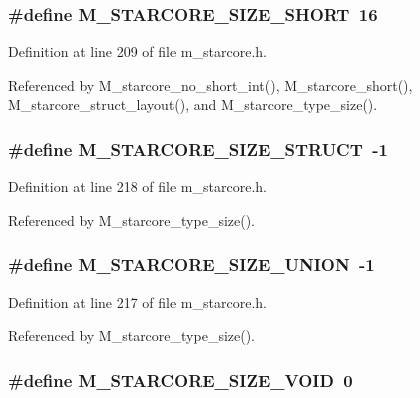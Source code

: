 \subsubsection{\setlength{\rightskip}{0pt plus 5cm}\#define M\_\-STARCORE\_\-SIZE\_\-SHORT~16}\label{m__starcore_8h_25f53aab6d1612ad8fffc411fe5570ed}




Definition at line 209 of file m\_\-starcore.h.

Referenced by M\_\-starcore\_\-no\_\-short\_\-int(), M\_\-starcore\_\-short(), M\_\-starcore\_\-struct\_\-layout(), and M\_\-starcore\_\-type\_\-size().
\subsubsection{\setlength{\rightskip}{0pt plus 5cm}\#define M\_\-STARCORE\_\-SIZE\_\-STRUCT~-1}\label{m__starcore_8h_48676e488cc577454d2aaac4f11f7ef4}




Definition at line 218 of file m\_\-starcore.h.

Referenced by M\_\-starcore\_\-type\_\-size().
\subsubsection{\setlength{\rightskip}{0pt plus 5cm}\#define M\_\-STARCORE\_\-SIZE\_\-UNION~-1}\label{m__starcore_8h_b155b80205b1dc66adb99180a5c11e5c}




Definition at line 217 of file m\_\-starcore.h.

Referenced by M\_\-starcore\_\-type\_\-size().
\subsubsection{\setlength{\rightskip}{0pt plus 5cm}\#define M\_\-STARCORE\_\-SIZE\_\-VOID~0}\label{m__starcore_8h_94d700f21c2b9c1f1e04b087ddd3aa74}




